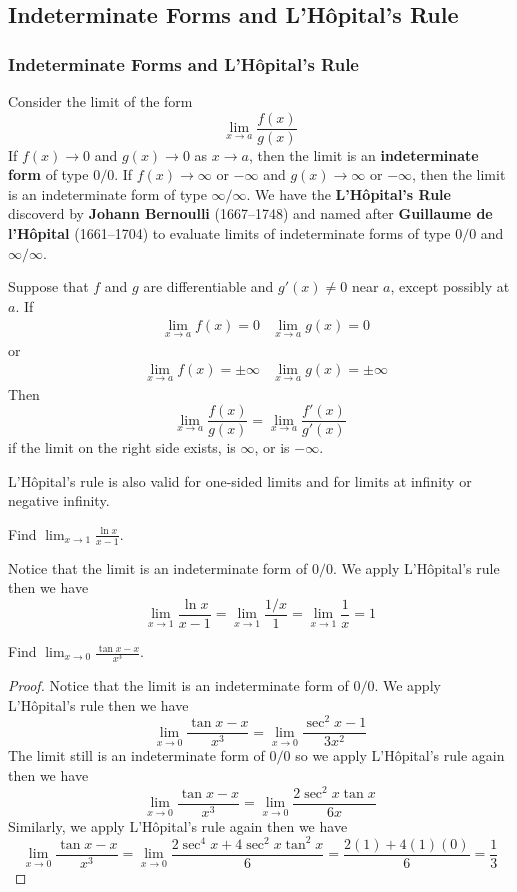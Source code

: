 \subsection{Indeterminate Forms and L'Hôpital's Rule}

\subsubsection*{Indeterminate Forms and L'Hôpital's Rule}
Consider the limit of the form \[\lim_{x\to a}\frac{f(x)}{g(x)}\]
If \(f(x)\to 0\) and \(g(x)\to 0\) as \(x\to a\), then the limit is an
\textbf{indeterminate form} of type \(0/0\).
If \(f(x)\to\infty\) or \(-\infty\) and \(g(x)\to\infty\) or \(-\infty\),
then the limit is an indeterminate form of type \(\infty/\infty\).
We have the \textbf{L'Hôpital's Rule} discoverd by
\textbf{Johann Bernoulli} (1667--1748) and named after
\textbf{Guillaume de l'Hôpital} (1661--1704) to evaluate limits of indeterminate
forms of type \(0/0\) and \(\infty/\infty\).
\begin{theorem}
    Suppose that \(f\) and \(g\) are differentiable and \(g'(x)\neq 0\) near \(a\),
    except possibly at \(a\).
    If
    \begin{align*}
        &\lim_{x\to a}f(x)=0&\lim_{x\to a}g(x)=0
    \end{align*}
    or
    \begin{align*}
        &\lim_{x\to a}f(x)=\pm\infty&\lim_{x\to a}g(x)=\pm\infty
    \end{align*}
    Then
    \[\lim_{x\to a}\frac{f(x)}{g(x)}=\lim_{x\to a}\frac{f'(x)}{g'(x)}\]
    if the limit on the right side exists, is \(\infty\), or is \(-\infty\).
\end{theorem}
L'Hôpital's rule is also valid for one-sided limits and for limits at infinity
or negative infinity.
\begin{problem}
    Find \(\displaystyle{\lim_{x\to 1}\frac{\ln x}{x-1}}\).
\end{problem}
\begin{solution}
    Notice that the limit is an indeterminate form of \(0/0\).
    We apply L'Hôpital's rule then we have
    \[\lim_{x\to 1}\dfrac{\ln x}{x-1}=\lim_{x\to 1}\frac{1/x}{1}
    =\lim_{x\to 1}\frac{1}{x}=1\]
\end{solution}
\begin{problem}
    Find \(\displaystyle{\lim_{x\to 0}\frac{\tan x-x}{x^3}}\).
\end{problem}
\begin{proof}
    Notice that the limit is an indeterminate form of \(0/0\).
    We apply L'Hôpital's rule then we have
    \[\lim_{x\to 0}\frac{\tan x-x}{x^3}=\lim_{x\to 0}\frac{\sec^2 x-1}{3x^2}\]
    The limit still is an indeterminate form of \(0/0\) so we apply
    L'Hôpital's rule again then we have
    \[\lim_{x\to 0}\frac{\tan x-x}{x^3}
    =\lim_{x\to 0}\frac{2\sec^2 x\tan x}{6x}\]
    Similarly, we apply L'Hôpital's rule again then we have
    \[\lim_{x\to 0}\frac{\tan x-x}{x^3}
    =\lim_{x\to 0}\frac{2\sec^4 x+4\sec^2 x\tan^2 x}{6}
    =\frac{2(1)+4(1)(0)}{6}=\frac{1}{3}\]
\end{proof}
